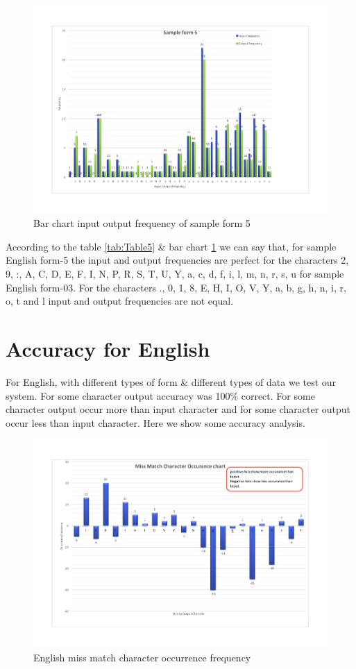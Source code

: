 \begin{figure}[H]
\centering
\includegraphics[width=1\textwidth]{form5.pdf}
\caption {Bar chart input output frequency of sample form 5}
\label {fig:bar5}
\end{figure}
According to the table \ref{tab:Table5} \& bar chart \ref{fig:bar5} we can say that, for sample English form-5 the input and output frequencies are perfect for the characters 2, 9, :, A, C, D, E, F, I, N, P, R, S, T, U, Y, a, c, d, f, i, l, m, n, r, s, u for sample English form-03. For the characters ., 0, 1, 8, E, H, I, O, V, Y, a, b, g, h, n, i, r, o, t and l input and output frequencies are not equal. 
\section{Accuracy for English}
For English, with different types of form \& different types of data we test our system. For some character output accuracy was 100\% correct. For some character output occur more than input character and for some character output occur less than input character. Here we show some accuracy analysis.

\begin{figure}[H]
\centering
\includegraphics[width=1\textwidth]{EOccurance.pdf}
\caption {English miss match character occurrence frequency}
\label {fig:Accuracy}
\end{figure}

